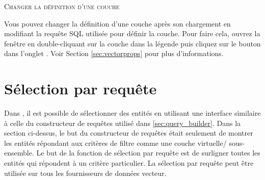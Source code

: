 \begin{Tip}\caption{\textsc{Changer la définition d'une couche}}
Vous pouvez changer la définition d'une couche après son chargement en modifiant la requête SQL utilisée pour définir la couche. Pour faire cela, ouvrez la fenêtre  en double-cliquant sur la couche dans la légende puis cliquez sur le bouton  dans l'onglet . Voir Section \ref{sec:vectorprops} pour plus d'informations.
\end{Tip}

\section{Sélection par requête}\label{sec:select_by_query}

Dans \qg, il est possible de sélectionner des entités en utilisant une interface similaire à celle du constructeur de requêtes utilisé dans \ref{sec:query_builder}. Dans la section ci-dessus, le but du constructeur de requêtes était seulement de montrer les entités répondant aux critères de filtre comme une \og couche virtuelle\fg/ sous-ensemble. Le but de la fonction de sélection par requête est de surligner toutes les entités qui répondent à un critère particulier. La sélection par requête peut être utilisée sur tous les fournisseurs de données vecteur.

